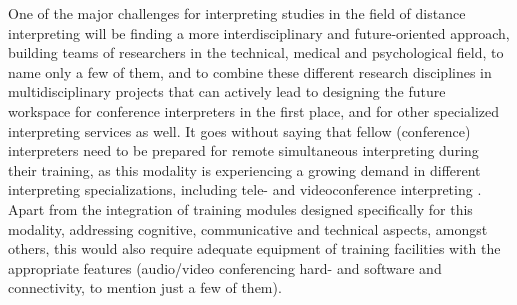 \documentclass[output=paper]{langsci/langscibook}
\begin{document}
One of the major challenges for interpreting studies in the field of distance interpreting will be finding a more interdisciplinary and future-oriented approach, building teams of researchers in the technical, medical and psychological field, to name only a few of them, and to combine these different research disciplines in multidisciplinary projects that can actively lead to designing the future work\-space for conference interpreters in the first place, and for other specialized interpreting services as well. It goes without saying that fellow (conference) interpreters need to be prepared for remote simultaneous interpreting during their training, as this modality is experiencing a growing demand in different interpreting specializations, including tele- and videoconference interpreting \citep{Braun2015}. Apart from the integration of training modules designed specifically for this modality, addressing cognitive, communicative and technical aspects, amongst others, this would also require adequate equipment of training facilities with the appropriate features (audio/video conferencing hard- and software and connectivity, to mention just a few of them).
 
\nocite{ISO2603,ISO4043,AVIDICUS1,AVIDICUS2,AVIDICUS3}
{\sloppy\printbibliography[heading=subbibliography,notkeyword=this]}
\end{document}
